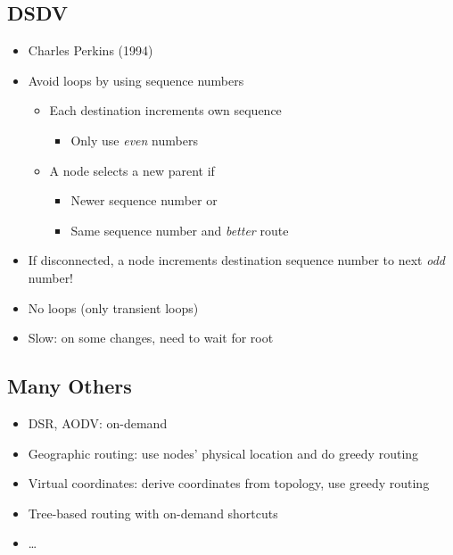 \subsection{DSDV}
\begin{itemize}[nosep]
    \item Charles Perkins (1994)
    \item Avoid loops by using sequence numbers
          \begin{itemize}[nosep]
              \item Each destination increments own sequence
                    \begin{itemize}[nosep]
                        \item Only use \emph{even} numbers
                    \end{itemize}
              \item A node selects a new parent if
                    \begin{itemize}[nosep]
                        \item Newer sequence number or
                        \item Same sequence number and \emph{better} route
                    \end{itemize}
          \end{itemize}
    \item If disconnected, a node increments destination sequence number to next \emph{odd} number!
    \item No loops (only transient loops)
    \item Slow: on some changes, need to wait for root
\end{itemize}
\subsection{Many Others}
\begin{itemize}[nosep]
    \item DSR, AODV: on-demand
    \item Geographic routing: use nodes' physical location and do greedy routing
    \item Virtual coordinates: derive coordinates from topology, use greedy routing
    \item Tree-based routing with on-demand shortcuts
    \item \dots
\end{itemize}